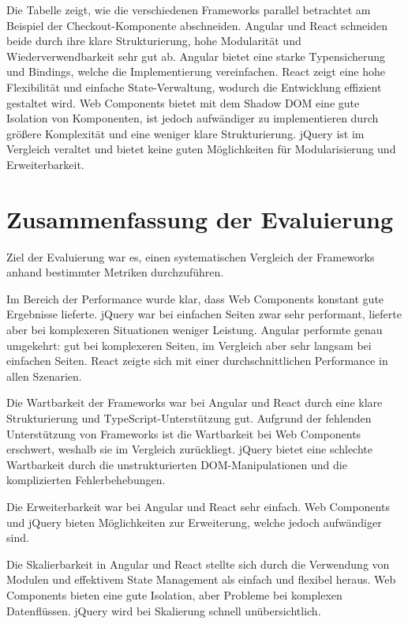 \documentclass[oneside]{ausarbeitung}
\begin{document}
Die Tabelle zeigt, wie die verschiedenen Frameworks parallel betrachtet am Beispiel der Checkout-Komponente abschneiden. Angular und React schneiden beide durch ihre klare Strukturierung, hohe Modularität und Wiederverwendbarkeit sehr gut ab. Angular bietet eine starke Typensicherung und Bindings, welche die Implementierung vereinfachen. React zeigt eine hohe Flexibilität und einfache State-Verwaltung, wodurch die Entwicklung effizient gestaltet wird. Web Components bietet mit dem Shadow DOM eine gute Isolation von Komponenten, ist jedoch aufwändiger zu implementieren durch größere Komplexität und eine weniger klare Strukturierung. jQuery ist im Vergleich veraltet und bietet keine guten Möglichkeiten für Modularisierung und Erweiterbarkeit.

\section{Zusammenfassung der Evaluierung}
\label{sec:Zusammenfassung_der_Evaluierung}

Ziel der Evaluierung war es, einen systematischen Vergleich der Frameworks anhand bestimmter Metriken durchzuführen. 

Im Bereich der Performance wurde klar, dass Web Components konstant gute Ergebnisse lieferte. jQuery war bei einfachen Seiten zwar sehr performant, lieferte aber bei komplexeren Situationen weniger Leistung. Angular performte genau umgekehrt: gut bei komplexeren Seiten, im Vergleich aber sehr langsam bei einfachen Seiten. React zeigte sich mit einer durchschnittlichen Performance in allen Szenarien.

Die Wartbarkeit der Frameworks war bei Angular und React durch eine klare Strukturierung und TypeScript-Unterstützung gut. Aufgrund der fehlenden Unterstützung von Frameworks ist die Wartbarkeit bei Web Components erschwert, weshalb sie im Vergleich zurückliegt. jQuery bietet eine schlechte Wartbarkeit durch die unstrukturierten DOM-Manipulationen und die komplizierten Fehlerbehebungen. 

Die Erweiterbarkeit war bei Angular und React sehr einfach. Web Components und jQuery bieten Möglichkeiten zur Erweiterung, welche jedoch aufwändiger sind.

Die Skalierbarkeit in Angular und React stellte sich durch die Verwendung von Modulen und effektivem State Management als einfach und flexibel heraus. Web Components bieten eine gute Isolation, aber Probleme bei komplexen Datenflüssen. jQuery wird bei Skalierung schnell unübersichtlich.
\end{document}

